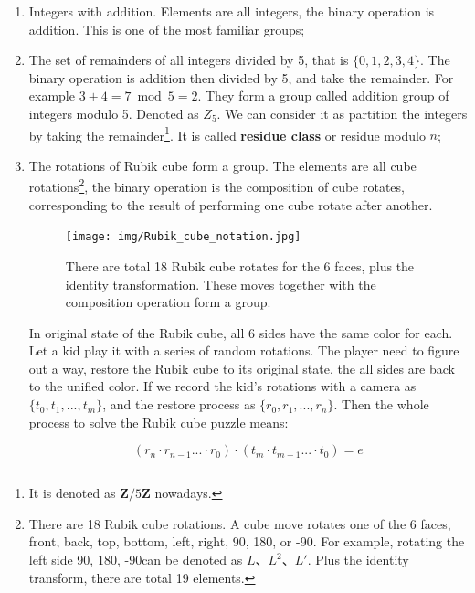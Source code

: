 \documentclass[b5paper]{article}
\begin{document}
\begin{enumerate}
\item Integers with addition. Elements are all integers, the binary operation is addition. This is one of the most familiar groups;

\item The set of remainders of all integers divided by 5, that is $\{0, 1, 2, 3, 4\}$. The binary operation is addition then divided by 5, and take the remainder. For example $3 + 4 = 7 \bmod 5 = 2$. They form a group called addition group of integers modulo 5. Denoted as $Z_5$. We can consider it as partition the integers by taking the remainder\footnote{It is denoted as $\pmb{Z}/5\pmb{Z}$ nowadays.}. It is called \textbf{residue class} or residue modulo $n$;

\item The rotations of Rubik cube form a group. The elements are all cube rotations\footnote{There are 18 Rubik cube rotations. A cube move rotates one of the 6 faces, front, back, top, bottom, left, right, 90\degree, 180\degree, or -90\degree. For example, rotating the left side 90\degree, 180\degree, -90\degree can be denoted as $L$、$L^2$、$L'$\cite{Wiki-Rubik-Cube-group}. Plus the identity transform, there are total 19 elements.}, the binary operation is the composition of cube rotates, corresponding to the result of performing one cube rotate after another.

\begin{figure}[htbp]
 \centering
 \texttt{[image: img/Rubik\_cube\_notation.jpg]}
 \caption{There are total 18 Rubik cube rotates for the 6 faces, plus the identity transformation. These moves together with the composition operation form a group.}
 \label{fig:Rubik-cube-notation}
\end{figure}

In original state of the Rubik cube, all 6 sides have the same color for each. Let a kid play it with a series of random rotations. The player need to figure out a way, restore the Rubik cube to its original state, the all sides are back to the unified color. If we record the kid's rotations with a camera as $\{t_0, t_1, ..., t_m\}$, and the restore process as $\{r_0, r_1, ..., r_n\}$. Then the whole process to solve the Rubik cube puzzle means:

\[
  (r_n \cdot r_{n-1} ... \cdot r_0) \cdot (t_m \cdot t_{m-1} ... \cdot t_0) = e
\]


\end{enumerate}
\end{document}
